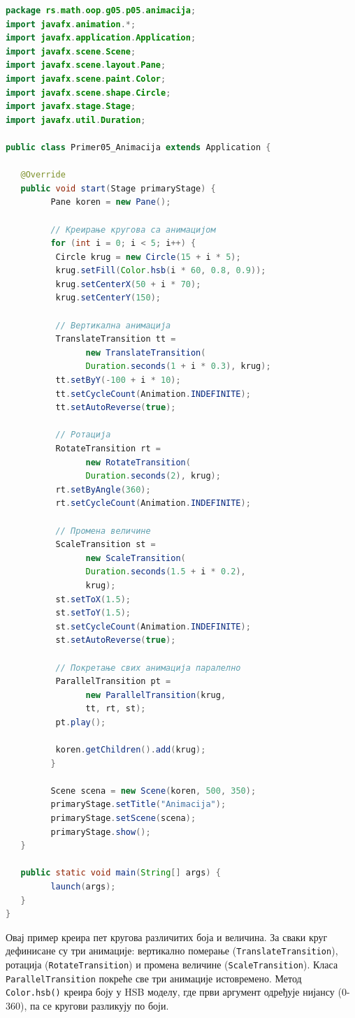 \begin{lstlisting}[language=Java]
package rs.math.oop.g05.p05.animacija;
import javafx.animation.*;
import javafx.application.Application;
import javafx.scene.Scene;
import javafx.scene.layout.Pane;
import javafx.scene.paint.Color;
import javafx.scene.shape.Circle;
import javafx.stage.Stage;
import javafx.util.Duration;
 
public class Primer05_Animacija extends Application {
 
   @Override
   public void start(Stage primaryStage) {
         Pane koren = new Pane();
 
         // Креирање кругова са анимацијом
         for (int i = 0; i < 5; i++) {
          Circle krug = new Circle(15 + i * 5);
          krug.setFill(Color.hsb(i * 60, 0.8, 0.9));
          krug.setCenterX(50 + i * 70);
          krug.setCenterY(150);
 
          // Вертикална анимација
          TranslateTransition tt =
                new TranslateTransition(
                Duration.seconds(1 + i * 0.3), krug);
          tt.setByY(-100 + i * 10);
          tt.setCycleCount(Animation.INDEFINITE);
          tt.setAutoReverse(true);
 
          // Ротација
          RotateTransition rt =
                new RotateTransition(
                Duration.seconds(2), krug);
          rt.setByAngle(360);
          rt.setCycleCount(Animation.INDEFINITE);
 
          // Промена величине
          ScaleTransition st =
                new ScaleTransition(
                Duration.seconds(1.5 + i * 0.2),
                krug);
          st.setToX(1.5);
          st.setToY(1.5);
          st.setCycleCount(Animation.INDEFINITE);
          st.setAutoReverse(true);
 
          // Покретање свих анимација паралелно
          ParallelTransition pt =
                new ParallelTransition(krug,
                tt, rt, st);
          pt.play();
 
          koren.getChildren().add(krug);
         }
 
         Scene scena = new Scene(koren, 500, 350);
         primaryStage.setTitle("Animacija");
         primaryStage.setScene(scena);
         primaryStage.show();
   }
 
   public static void main(String[] args) {
         launch(args);
   }
}
\end{lstlisting}


Овај пример креира пет кругова различитих боја и величина. За сваки круг дефинисане су три анимације: вертикално померање (\texttt{TranslateTransition}), ротација (\texttt{RotateTransition}) и промена величине (\texttt{ScaleTransition}). Класа \texttt{ParallelTransition} покреће све три анимације истовремено. Метод \texttt{Color.hsb()} креира боју у HSB моделу, где први аргумент одређује нијансу (0-360), па се кругови разликују по боји.


